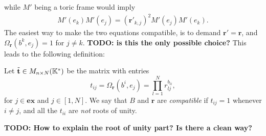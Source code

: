 \documentclass{article}
\begin{document}
while $M'$ being a toric frame would imply
\begin{align*}
    M'(e_k)M'(e_j) = (\mathbf{r}'_{k,j})^2 M'(e_j)M'(e_k).
\end{align*}
The easiest way to make the two equations compatible,
is to demand $\mathbf{r}' = \mathbf{r}$,
and $\Omega_{\mathbf{r}}(b^k, e_j) = 1$ for $j \neq k$.
\textbf{TODO: is this the only possible choice?}
This leads to the following definition:
\begin{definition}
    Let $\tilde{\mathbf{t}} \in M_{n \times N}(\mathbb{K}^*)$ be the matrix with entries
    \begin{equation*}
        t_{ij} = \Omega_{\mathbf{r}}(b^i, e_j) = \prod_{l = 1}^N r_{lj}^{b_{li}},
    \end{equation*}
    for $j \in \mathbf{ex}$ and $j \in [1, N]$.
    We say that $B$ and $\mathbf{r}$ are \emph{compatible} if
    $t_{ij} = 1$ whenever $i \neq j$,
    and all the $t_{ii}$ are \emph{not} roots of unity.
\end{definition}
\textbf{TODO: How to explain the root of unity part? Is there a clean way?}



\end{document}
